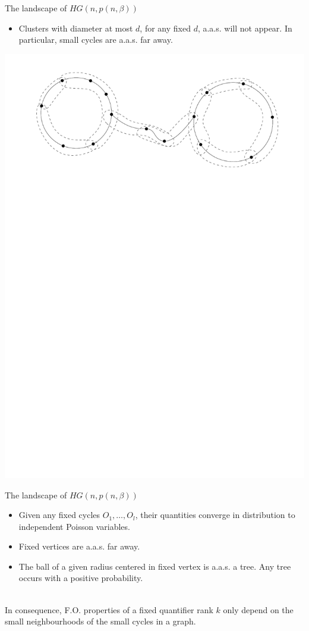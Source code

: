 \documentclass[11pt]{beamer}
\begin{document}
	\begin{frame}{The landscape of $HG(n,p(n,\beta))$}
		\begin{itemize}
		\item Clusters with diameter at most $d$, for any fixed $d$, a.a.s. will not appear.
		In particular, small cycles are a.a.s. far away.
	\end{itemize}
	\begin{center}
			\includegraphics[width=0.8\linewidth]{FarCycles.pdf}
	\end{center}
		
	\end{frame}

	\begin{frame}{The landscape of $HG(n,p(n,\beta))$}
	\begin{itemize}
		\item Given any fixed cycles $O_1, \dots, O_l$, their quantities converge
		in distribution to independent Poisson 
		variables.
		\vspace{1em}
		\item Fixed vertices are a.a.s. far away.
		\vspace{1em}
		\item The ball of a given radius centered in fixed
		vertex is a.a.s. a tree. Any tree occurs with a positive 
		probability.
	\end{itemize}
	~\\
	In consequence, F.O. properties of a fixed quantifier rank $k$ only depend on the small neighbourhoods of the small cycles in
	a graph.  
	\end{frame}
	
\end{document}
